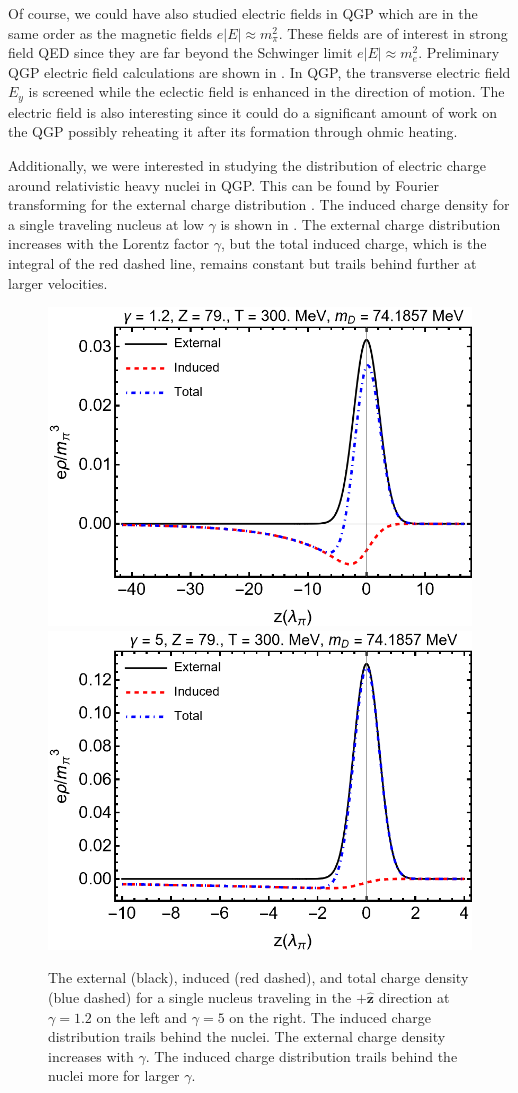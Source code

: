 Of course, we could have also studied electric fields in QGP which are in the same order as the magnetic fields $e|E| \approx m_\pi^2$. These fields are of interest in strong field QED since they are far beyond the Schwinger limit $e|E| \approx m_e^2$. Preliminary QGP electric field calculations are shown in 
. In QGP, the transverse electric field $E_y$ is screened while the eclectic field is enhanced in the direction of motion. The electric field is also interesting since it could do a significant amount of work on the QGP possibly reheating it after its formation through ohmic heating. 

Additionally, we were interested in studying the distribution of electric charge around relativistic heavy nuclei in QGP. This can be found by Fourier transforming  for the external charge distribution . The induced charge density for a single traveling nucleus at low $\gamma$ is shown in . The external charge distribution increases with the Lorentz factor $\gamma$, but the total induced charge, which is the integral of the red dashed line, remains constant but trails behind further at larger velocities.

\phantom{Phantom text}
\begin{figure}[ht]
\centering
\includegraphics[width=0.45\linewidth]{plots/chap02QCD/indchg12.png}
\hspace{0.05\linewidth}
\includegraphics[width=0.45\linewidth]{plots/chap02QCD/indchg5.png}
\caption{The external (black), induced (red dashed), and total charge density (blue dashed) for a single nucleus traveling in the $+\boldsymbol{\hat{z}}$ direction at $\gamma = 1.2$ on the left and $\gamma = 5$ on the right. The induced charge distribution trails behind the nuclei. The external charge density increases with $\gamma$. The induced charge distribution trails behind the nuclei more for larger $\gamma$. \label{fig:potcomp}}
\end{figure}

